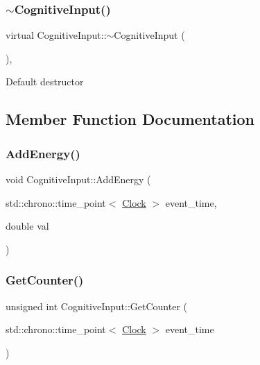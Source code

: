 \subsubsection{\texorpdfstring{$\sim$\+Cognitive\+Input()}{~CognitiveInput()}}
{\footnotesize\ttfamily virtual Cognitive\+Input\+::$\sim$\+Cognitive\+Input (\begin{DoxyParamCaption}{ }\end{DoxyParamCaption})\hspace{0.3cm}{\ttfamily [inline]}, {\ttfamily [virtual]}}

Default destructor 

\subsection{Member Function Documentation}
\mbox{\label{classCognitiveInput_a23f56d012233f655e1530ab61d80c27f}} 
\subsubsection{\texorpdfstring{Add\+Energy()}{AddEnergy()}}
{\footnotesize\ttfamily void Cognitive\+Input\+::\+Add\+Energy (\begin{DoxyParamCaption}\item[{std\+::chrono\+::time\+\_\+point$<$ \mbox{\hyperlink{universe_8h_a0ef8d951d1ca5ab3cfaf7ab4c7a6fd80}{Clock}} $>$}]{event\+\_\+time,  }\item[{double}]{val }\end{DoxyParamCaption})\hspace{0.3cm}{\ttfamily [inline]}}

\mbox{\label{classCognitiveInput_a695e7e57b717210b64f9e2c4e26c8044}} 
\subsubsection{\texorpdfstring{Get\+Counter()}{GetCounter()}}
{\footnotesize\ttfamily unsigned int Cognitive\+Input\+::\+Get\+Counter (\begin{DoxyParamCaption}\item[{std\+::chrono\+::time\+\_\+point$<$ \mbox{\hyperlink{universe_8h_a0ef8d951d1ca5ab3cfaf7ab4c7a6fd80}{Clock}} $>$}]{event\+\_\+time }\end{DoxyParamCaption})\hspace{0.3cm}{\ttfamily [inline]}}


